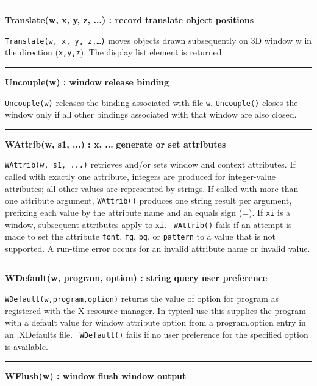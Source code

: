 \bigskip\hrule\vspace{0.1cm}
\noindent
{\bf Translate(w, x, y, z, ...) : record } \hfill {\bf translate object positions}

\noindent
\texttt{Translate(w, x, y, z,{\dots})} moves objects drawn subsequently
on 3D window w in the direction (\texttt{x,y,z}). The display list
element is returned.

\bigskip\hrule\vspace{0.1cm}
\noindent
{\bf Uncouple(w) : window } \hfill {\bf release binding}

\noindent
\texttt{Uncouple(w)} releases the binding associated with file
\texttt{w}. \texttt{Uncouple()} closes the window only if all other
bindings associated with that window are also closed.

\bigskip\hrule\vspace{0.1cm}
\noindent
{\bf WAttrib(w, s1, ...) : x, ... } \hfill {\bf generate or set attributes}

\noindent
\texttt{WAttrib(w, s1, ...)} retrieves and/or sets window and context
attributes. If called with exactly one attribute, integers are produced
for integer-value attributes; all other values are represented by
strings. If called with more than one attribute argument,
\texttt{WAttrib()} produces one string result per argument, prefixing
each value by the attribute name and an equals sign (=). If
\texttt{xi} is a window, subsequent attributes apply to \texttt{xi}.
\ \texttt{WAttrib()} fails if an attempt is made to set the attribute
\texttt{font}, \texttt{fg}, \texttt{bg}, or \texttt{pattern} to a value
that is not supported. A run-time error occurs for an invalid attribute
name or invalid value.

\bigskip\hrule\vspace{0.1cm}
\noindent
{\bf WDefault(w, program, option) : string } \hfill {\bf query user preference}

\noindent
\texttt{WDefault(w,program,option)} returns the value of option for
program as registered with the X resource manager. In typical use this
supplies the program with a default value for window attribute option
from a program.option entry in an .XDefaults file.
\ \texttt{WDefault()} fails if no user preference for the specified
option is available.

\bigskip\hrule\vspace{0.1cm}
\noindent
{\bf WFlush(w) : window } \hfill {\bf flush window output}

